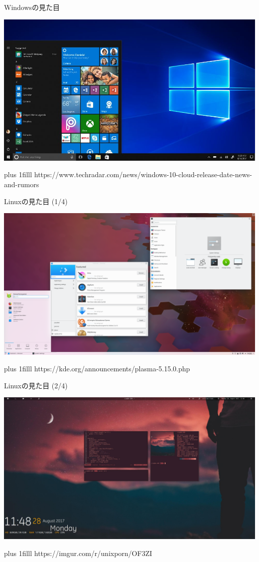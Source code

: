 \documentclass[uplatex, dvipdfmx, 12pt]{beamer}
\newcommand{\source}[1]{{\vskip0pt plus 1filll \scriptsize #1}}
\begin{document}
\begin{frame}{Windowsの見た目}
  \begin{center}\includegraphics[width=\textwidth]{./figures/Windows.jpg}\end{center}
  \source{https://www.techradar.com/news/windows-10-cloud-release-date-news-and-rumors}
\end{frame}
\begin{frame}{Linuxの見た目 (1/4)}
  \begin{center}\includegraphics[width=\textwidth]{./figures/Plasma.png}\end{center}
  \source{https://kde.org/announcements/plasma-5.15.0.php}
\end{frame}
\begin{frame}{Linuxの見た目 (2/4)}
  \begin{center}\includegraphics[width=\textwidth]{./figures/bspwm.jpg}\end{center}
  \source{https://imgur.com/r/unixporn/OF3ZI}
\end{frame}
\end{document}
